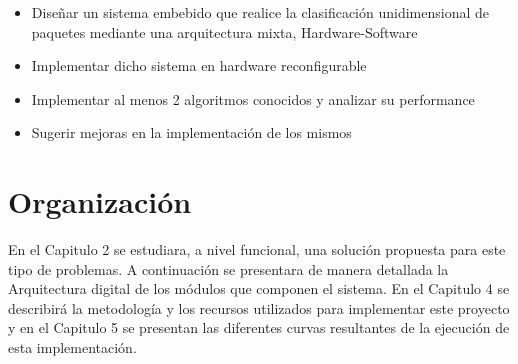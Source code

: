     \begin{itemize}     

     	\item Diseñar un sistema embebido que realice la clasificación unidimensional de paquetes mediante una arquitectura mixta, Hardware-Software
	\item Implementar dicho sistema en hardware reconfigurable
	\item Implementar al menos 2 algoritmos conocidos y analizar su performance
	\item Sugerir mejoras en la implementación de los mismos   

\end{itemize}


\section{Organización}

En el Capitulo 2 se estudiara, a nivel funcional, una solución propuesta para este tipo de problemas. A continuación se presentara de manera detallada la Arquitectura digital de los módulos que componen el sistema. En el Capitulo 4 se describirá la metodología y los recursos utilizados para implementar este proyecto y en el Capitulo 5 se presentan las diferentes curvas resultantes de la ejecución de esta implementación.





